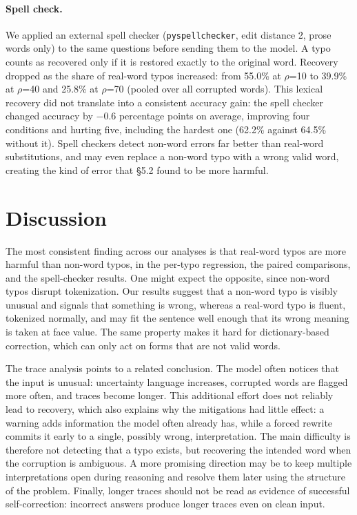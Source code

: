 \documentclass[11pt]{article}
\begin{document}
\paragraph{Spell check.} We applied an external spell checker (\texttt{pyspellchecker}, edit distance 2, prose words only) to the same questions before sending them to the model. A typo counts as recovered only if it is restored exactly to the original word. Recovery dropped as the share of real-word typos increased: from 55.0\% at $\rho$=10 to 39.9\% at $\rho$=40 and 25.8\% at $\rho$=70 (pooled over all corrupted words). This lexical recovery did not translate into a consistent accuracy gain: the spell checker changed accuracy by $-$0.6 percentage points on average, improving four conditions and hurting five, including the hardest one (62.2\% against 64.5\% without it). Spell checkers detect non-word errors far better than real-word substitutions, and may even replace a non-word typo with a wrong valid word, creating the kind of error that \S5.2 found to be more harmful.

\section{Discussion}
The most consistent finding across our analyses is that real-word typos are more harmful than non-word typos, in the per-typo regression, the paired comparisons, and the spell-checker results. One might expect the opposite, since non-word typos disrupt tokenization. Our results suggest that a non-word typo is visibly unusual and signals that something is wrong, whereas a real-word typo is fluent, tokenized normally, and may fit the sentence well enough that its wrong meaning is taken at face value. The same property makes it hard for dictionary-based correction, which can only act on forms that are not valid words.

The trace analysis points to a related conclusion. The model often notices that the input is unusual: uncertainty language increases, corrupted words are flagged more often, and traces become longer. This additional effort does not reliably lead to recovery, which also explains why the mitigations had little effect: a warning adds information the model often already has, while a forced rewrite commits it early to a single, possibly wrong, interpretation. The main difficulty is therefore not detecting that a typo exists, but recovering the intended word when the corruption is ambiguous. A more promising direction may be to keep multiple interpretations open during reasoning and resolve them later using the structure of the problem. Finally, longer traces should not be read as evidence of successful self-correction: incorrect answers produce longer traces even on clean input.
\end{document}
